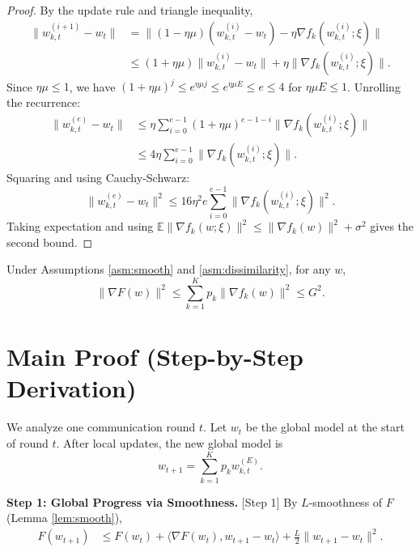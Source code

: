 \documentclass{article}
\begin{document}
\begin{proof}
    By the update rule and triangle inequality,
    \begin{align*}
        \| w_{k,t}^{(i+1)} - w_t \| 
        &= \| (1 - \eta \mu)(w_{k,t}^{(i)} - w_t) - \eta \nabla f_k(w_{k,t}^{(i)}; \xi) \| \\
        &\leq (1 + \eta \mu) \| w_{k,t}^{(i)} - w_t \| + \eta \| \nabla f_k(w_{k,t}^{(i)}; \xi) \|.
    \end{align*}
    Since $\eta \mu \leq 1$, we have $(1+\eta\mu)^j \leq e^{\eta\mu j} \leq e^{\eta\mu E} \leq e \leq 4$ for $\eta\mu E \leq 1$. Unrolling the recurrence:
    \begin{align*}
        \| w_{k,t}^{(e)} - w_t \| 
        &\leq \eta \sum_{i=0}^{e-1} (1+\eta\mu)^{e-1-i} \| \nabla f_k(w_{k,t}^{(i)}; \xi) \| \\
        &\leq 4 \eta \sum_{i=0}^{e-1} \| \nabla f_k(w_{k,t}^{(i)}; \xi) \|.
    \end{align*}
    Squaring and using Cauchy-Schwarz:
    \begin{equation*}
        \| w_{k,t}^{(e)} - w_t \|^2 \leq 16 \eta^2 e \sum_{i=0}^{e-1} \| \nabla f_k(w_{k,t}^{(i)}; \xi) \|^2.
    \end{equation*}
    Taking expectation and using $\mathbb{E} \| \nabla f_k(w; \xi) \|^2 \leq \| \nabla f_k(w) \|^2 + \sigma^2$ gives the second bound.
\end{proof}

\begin{lemma} \label{lem:grad_bound}
    Under Assumptions \ref{asm:smooth} and \ref{asm:dissimilarity}, for any $w$,
    \begin{equation}
        \| \nabla F(w) \|^2 \leq \sum_{k=1}^K p_k \| \nabla f_k(w) \|^2 \leq G^2.
    \end{equation}
\end{lemma}

\section*{Main Proof (Step-by-Step Derivation)}

We analyze one communication round $t$. Let $w_t$ be the global model at the start of round $t$. After local updates, the new global model is
\begin{equation}
    w_{t+1} = \sum_{k=1}^K p_k w_{k,t}^{(E)}.
\end{equation}

\textbf{Step 1: Global Progress via Smoothness.} [Step 1]
By $L$-smoothness of $F$ (Lemma \ref{lem:smooth}),
\begin{align}
    F(w_{t+1}) &\leq F(w_t) + \langle \nabla F(w_t), w_{t+1} - w_t \rangle + \frac{L}{2} \| w_{t+1} - w_t \|^2. \label{eq:smooth_global}
\end{align}
\end{document}
